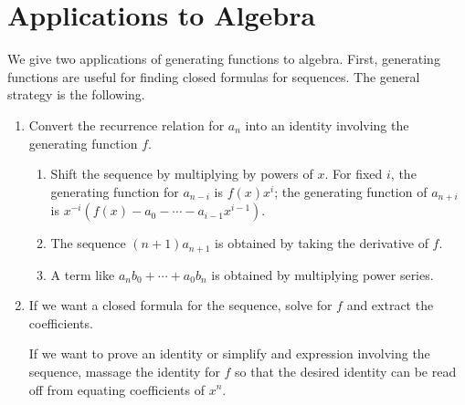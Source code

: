\section{Applications to Algebra}\label{alg}
We give two applications of generating functions to algebra.
First, generating functions are useful for finding closed formulas for sequences. The general strategy is the following.
\begin{enumerate}
\item Convert the recurrence relation for $a_n$ into an identity involving the generating function $f$.
\begin{enumerate}
\item Shift the sequence by multiplying by powers of $x$. For fixed $i$, the generating function for $a_{n-i}$ is $f(x)x^i$; the generating function of $a_{n+i}$ is $x^{-i}(f(x)-a_0-\cdots -a_{i-1}x^{i-1})$.
\item The sequence $(n+1)a_{n+1}$ is obtained by taking the derivative of $f$.
\item A term like $a_nb_0+\cdots+a_0b_n$ is obtained by multiplying power series.
\end{enumerate}
\item If we want a closed formula for the sequence, solve for $f$ and extract the coefficients.

If we want to prove an identity or simplify and expression involving the sequence, massage the identity for $f$ so that the desired identity can be read off from equating coefficients of $x^n$.
\end{enumerate}
